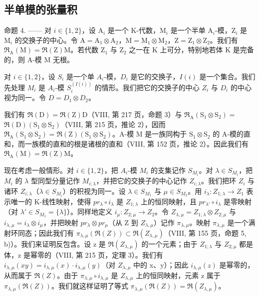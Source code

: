 \subsection{半单模的张量积}

命题 4. —— 对 \(i \in \{1,2\}\)，设 \(\mathrm{A}_i\) 是一个 K-代数，\(\mathrm{M}_i\) 是一个半单 \(\mathrm{A}_i\)-模，\(\mathrm{Z}_i\) 是 \(\mathrm{M}_i\) 的交换子的中心。令 \(\mathrm{A} = \mathrm{A}_1 \otimes \mathrm{A}_2\)，\(\mathrm{M} = \mathrm{M}_1 \otimes \mathrm{M}_2\)，\(\mathrm{Z} = \mathrm{Z}_1 \otimes \mathrm{Z}_2\)。我们有 \(\Re_{\mathrm{A}}(\mathrm{M}) = \Re(\mathrm{Z})\mathrm{M}\)。若代数 \(\mathrm{Z}_1\) 与 \(\mathrm{Z}_2\) 之一在 \(\mathrm{K}\) 上可分，特别地若体 \(\mathrm{K}\) 是完备的，则 A-模 \(\mathrm{M}\) 无根。

对 \(i \in \{1,2\}\)，设 \(S_i\) 是一个单 \(A_i\)-模，\(D_i\) 是它的交换子，\(I(i)\) 是一个集合。我们先处理 \(M_i\) 是 \(A_i\)-模 \(S_i^{(I(i))}\) 的情形。我们把它的交换子的中心 \(Z_i\) 与 \(D_i\) 的中心视为同一。令 \(D = D_1 \otimes D_2\)。

我们有 \(\Re (\mathrm{D}) = \Re (\mathrm{Z})\mathrm{D}\)（VIII, 第 217 页，命题 3）与 \(\Re_{\mathrm{A}}(\mathrm{S}_1\otimes \mathrm{S}_2) =\) \(\Re (\mathrm{D})(\mathrm{S}_1\otimes \mathrm{S}_2)\)（VIII, 第 215 页，推论 2），因而 \(\Re_{\mathrm{A}}(\mathrm{S}_1\otimes \mathrm{S}_2) = \Re (\mathrm{Z})(\mathrm{S}_1\otimes \mathrm{S}_2)\)。A-模 M 是一族同构于 \(\mathrm{S}_1\otimes \mathrm{S}_2\) 的 A-模的直和，而一族模的直和的根是诸根的直和（VIII, 第 152 页，推论 2）。因此我们有 \(\Re_{\mathrm{A}}(\mathrm{M}) = \Re (\mathrm{Z})\mathrm{M}\)。

现在考虑一般情形。对 \(i \in \{1,2\}\)，把 \(A_{i}\)-模 \(M_{i}\) 的支集记作 \(S_{M_{i}}\)。对 \(\lambda \in S_{M_{i}}\)，把 \(M_{i}\) 的 \(\lambda\) 型同型分量记作 \(M_{i;\lambda}\)，并把它的交换子的中心记作 \(Z_{i;\lambda}\)。我们把环 \(Z_{i}\) 与诸环 \(Z_{i;\lambda}\)（\(\lambda \in S_{M_{i}}\)）的积视为同一。设 \(\lambda \in S_{M_{1}}\) 与 \(\mu \in S_{M_{2}}\)。用 \(i_{\lambda}: Z_{1;\lambda} \to Z_{1}\) 表示唯一的 K-线性映射，使得 \(pr_{\lambda} \circ i_{\lambda}\) 是 \(Z_{1;\lambda}\) 上的恒同映射，且 \(pr_{\lambda'} \circ i_{\lambda}\) 是零映射（对 \(\lambda' \in S_{M_{1}} = \{\lambda\}\)）。同样地定义 \(i_{\mu}: Z_{2;\mu} \to Z_{2}\)。令 \(Z_{\lambda,\mu} = Z_{1;\lambda} \otimes Z_{2;\mu}\) 与 \(i_{\lambda,\mu} = i_{\lambda} \otimes i_{\mu}\)，并把映射 \(pr_{\lambda} \otimes pr_{\mu}\)（从 Z 到 \(Z_{\lambda,\mu}\)）记作 \(\pi_{\lambda,\mu}\)。映射 \(\pi_{\lambda,\mu}\) 是一个满射环同态；因此我们有 \(\pi_{\lambda,\mu}(\Re(Z)) \subset \Re(Z_{\lambda,\mu})\)（VIII, 第 155 页，命题 5, b)）。我们来证明反包含。设 z 是 \(\Re(Z_{\lambda,\mu})\) 的一个元素；由于 \(Z_{1;\lambda}\) 与 \(Z_{2;\mu}\) 都是体，z 是幂零的（VIII, 第 215 页，定理 3）。我们有 \(i_{\lambda,\mu}(xy) = i_{\lambda,\mu}(x) \cdot i_{\lambda,\mu}(y)\)（对 \(Z_{\lambda,\mu}\) 中的 x、y）；因此 \(i_{\lambda,\mu}(z)\) 是幂零的，从而属于 \(\Re(Z)\)。由于 \(\pi_{\lambda,\mu} \circ i_{\lambda,\mu}\) 是 \(Z_{\lambda,\mu}\) 上的恒同映射，元素 z 属于 \(\pi_{\lambda,\mu}(\Re(Z))\)。我们就这样证明了等式 \(\pi_{\lambda,\mu}(\Re(Z)) = \Re(Z_{\lambda,\mu})\)。


